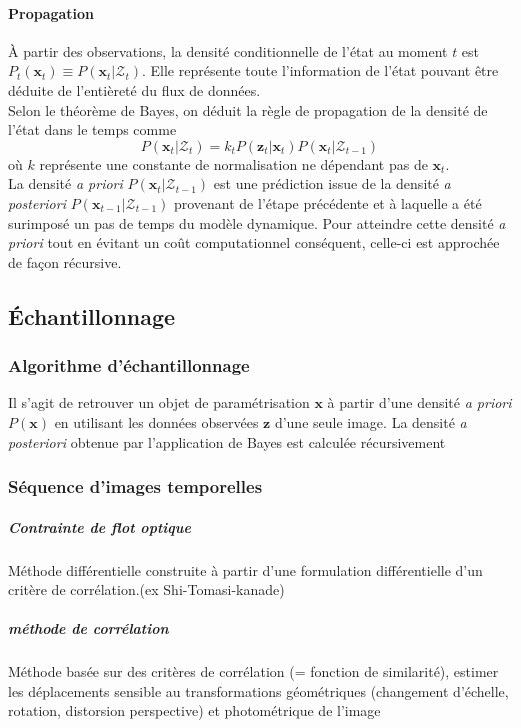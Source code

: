 \documentclass[a4paper,12pt]{report}
\begin{document}
\paragraph{Propagation}
\`{A} partir des observations, la densité conditionnelle de l'état au moment $t$ est $P_t(\mathbf{x}_t) \equiv P(\mathbf{x}_t|\mathcal{Z}_t)$. Elle représente toute l'information de l'état pouvant être déduite de l'entièreté du flux de données.\\
Selon le théorème de Bayes, on déduit la règle de propagation de la densité de l'état dans le temps comme  
$$P(\mathbf{x}_{t}|\mathcal{Z}_{t}) = k_t P(\mathbf{z}_t|\mathbf{x}_t)P(\mathbf{x}_t|\mathcal{Z}_{t-1})$$
où $k$ représente une constante de normalisation ne dépendant pas de $\mathbf{x}_t$.\\
La densité \textit{a priori} $P(\mathbf{x}_t|\mathcal{Z}_{t-1})$ est une prédiction issue de la densité \textit{a posteriori} $P(\mathbf{x}_{t-1}|\mathcal{Z}_{t-1})$ provenant de l'étape précédente et à laquelle a été surimposé un pas de temps du modèle dynamique.
Pour atteindre cette densité \textit{a priori} tout en évitant un coût computationnel conséquent, celle-ci est approchée de façon récursive.

\subsection{\'{E}chantillonnage}
\subsubsection{Algorithme d'échantillonnage}
Il s'agit de retrouver un objet de paramétrisation $\mathbf{x}$ à partir d'une densité \textit{a priori} $P(\mathbf{x})$ en utilisant les données observées $\mathbf{z}$ d'une seule image.
La densité \textit{a posteriori} obtenue par l'application de Bayes est calculée récursivement  
\subsubsection{Séquence d'images temporelles}

\subparagraph{Contrainte de flot optique}
Méthode différentielle construite à partir d'une formulation différentielle d'un critère de corrélation.(ex Shi-Tomasi-kanade)
\subparagraph{méthode de corrélation}
Méthode basée sur des critères de corrélation (= fonction de similarité), 
estimer les déplacements
sensible au transformations géométriques (changement d'échelle, rotation, distorsion perspective) et photométrique de l'image
\end{document}
